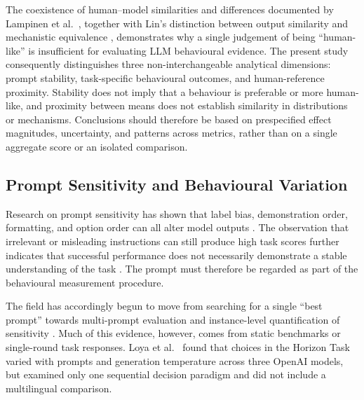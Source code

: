 The coexistence of human--model similarities and differences documented by Lampinen et al.~\cite{Lampinen2024ContentEffects}, together with Lin's distinction between output similarity and mechanistic equivalence \cite{Lin2025SixFallacies}, demonstrates why a single judgement of being ``human-like'' is insufficient for evaluating LLM behavioural evidence. The present study consequently distinguishes three non-interchangeable analytical dimensions: prompt stability, task-specific behavioural outcomes, and human-reference proximity. Stability does not imply that a behaviour is preferable or more human-like, and proximity between means does not establish similarity in distributions or mechanisms. Conclusions should therefore be based on prespecified effect magnitudes, uncertainty, and patterns across metrics, rather than on a single aggregate score or an isolated comparison.

\subsection{Prompt Sensitivity and Behavioural Variation}

Research on prompt sensitivity has shown that label bias, demonstration order, formatting, and option order can all alter model outputs \cite{Zhao2021Calibrate,Lu2022PromptOrder,Sclar2024PromptFormatting,Pezeshkpour2024OptionOrder}. The observation that irrelevant or misleading instructions can still produce high task scores further indicates that successful performance does not necessarily demonstrate a stable understanding of the task \cite{Webson2022PromptMeaning}. The prompt must therefore be regarded as part of the behavioural measurement procedure.

The field has accordingly begun to move from searching for a single ``best prompt'' towards multi-prompt evaluation and instance-level quantification of sensitivity \cite{Mizrahi2024MultiPrompt,Zhuo2024ProSA}. Much of this evidence, however, comes from static benchmarks or single-round task responses. Loya et al.~\cite{Loya2023PromptSensitivityDecision} found that choices in the Horizon Task varied with prompts and generation temperature across three OpenAI models, but examined only one sequential decision paradigm and did not include a multilingual comparison.

